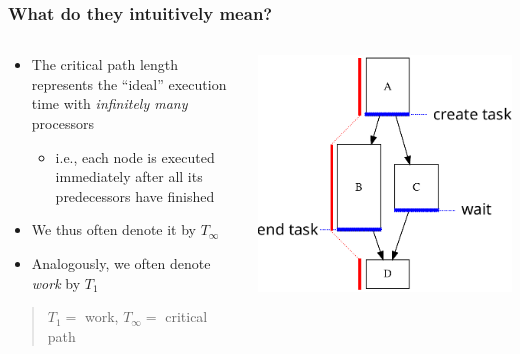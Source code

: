 \documentclass[12pt,dvipdfmx]{beamer}
\newcommand{\ao}[1]{{\color{blue}#1}}
\begin{document}
\begin{frame}[fragile]
\frametitle{What do they intuitively mean?}
\begin{columns}
\begin{column}{0.7\textwidth}
\begin{itemize}
\item The critical path length represents 
  the ``ideal'' execution time with 
  {\em infinitely many} processors
  \begin{itemize}
  \item i.e., each node is executed immediately after
    all its predecessors have finished
  \end{itemize}

\item We thus often denote it by \ao{$T_\infty$}

\item Analogously, we often denote \ao{\em work} by \ao{$T_1$}
\end{itemize}

\begin{quote}
\ao{$T_1 = $ work, $T_\infty = $ critical path}
\end{quote}
\end{column}

\begin{column}{0.3\textwidth}
\begin{center}
\includegraphics[width=\textwidth]{out/pdf/svg/dag_cp.pdf}


\end{center}
\end{column}
\end{columns}
\end{frame}
\end{document}
